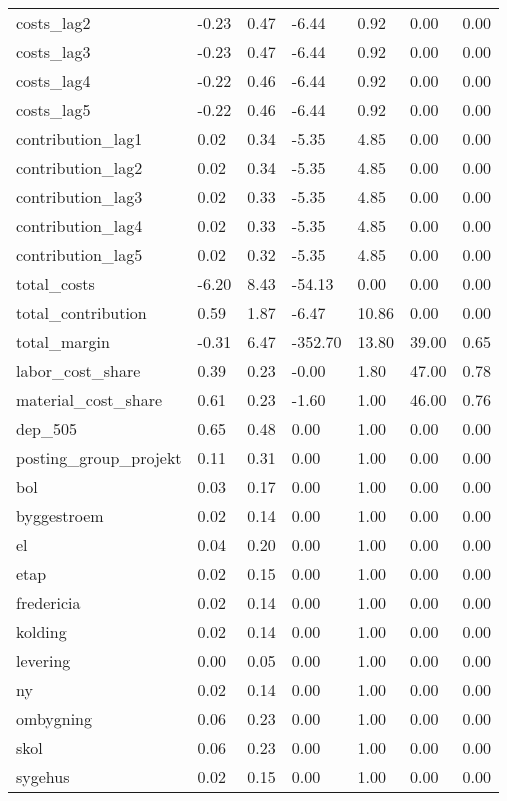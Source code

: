 \begin{landscape}
\begin{longtable}[h!]{lllllll}
costs_lag2 & -0.23 & 0.47 & -6.44 & 0.92 & 0.00 & 0.00 \\
costs_lag3 & -0.23 & 0.47 & -6.44 & 0.92 & 0.00 & 0.00 \\
costs_lag4 & -0.22 & 0.46 & -6.44 & 0.92 & 0.00 & 0.00 \\
costs_lag5 & -0.22 & 0.46 & -6.44 & 0.92 & 0.00 & 0.00 \\
contribution_lag1 & 0.02 & 0.34 & -5.35 & 4.85 & 0.00 & 0.00 \\
contribution_lag2 & 0.02 & 0.34 & -5.35 & 4.85 & 0.00 & 0.00 \\
contribution_lag3 & 0.02 & 0.33 & -5.35 & 4.85 & 0.00 & 0.00 \\
contribution_lag4 & 0.02 & 0.33 & -5.35 & 4.85 & 0.00 & 0.00 \\
contribution_lag5 & 0.02 & 0.32 & -5.35 & 4.85 & 0.00 & 0.00 \\
total_costs & -6.20 & 8.43 & -54.13 & 0.00 & 0.00 & 0.00 \\
total_contribution & 0.59 & 1.87 & -6.47 & 10.86 & 0.00 & 0.00 \\
total_margin & -0.31 & 6.47 & -352.70 & 13.80 & 39.00 & 0.65 \\
labor_cost_share & 0.39 & 0.23 & -0.00 & 1.80 & 47.00 & 0.78 \\
material_cost_share & 0.61 & 0.23 & -1.60 & 1.00 & 46.00 & 0.76 \\
dep_505 & 0.65 & 0.48 & 0.00 & 1.00 & 0.00 & 0.00 \\
posting_group_projekt & 0.11 & 0.31 & 0.00 & 1.00 & 0.00 & 0.00 \\
bol & 0.03 & 0.17 & 0.00 & 1.00 & 0.00 & 0.00 \\
byggestroem & 0.02 & 0.14 & 0.00 & 1.00 & 0.00 & 0.00 \\
el & 0.04 & 0.20 & 0.00 & 1.00 & 0.00 & 0.00 \\
etap & 0.02 & 0.15 & 0.00 & 1.00 & 0.00 & 0.00 \\
fredericia & 0.02 & 0.14 & 0.00 & 1.00 & 0.00 & 0.00 \\
kolding & 0.02 & 0.14 & 0.00 & 1.00 & 0.00 & 0.00 \\
levering & 0.00 & 0.05 & 0.00 & 1.00 & 0.00 & 0.00 \\
ny & 0.02 & 0.14 & 0.00 & 1.00 & 0.00 & 0.00 \\
ombygning & 0.06 & 0.23 & 0.00 & 1.00 & 0.00 & 0.00 \\
skol & 0.06 & 0.23 & 0.00 & 1.00 & 0.00 & 0.00 \\
sygehus & 0.02 & 0.15 & 0.00 & 1.00 & 0.00 & 0.00 \\

\end{longtable}
\end{landscape}
